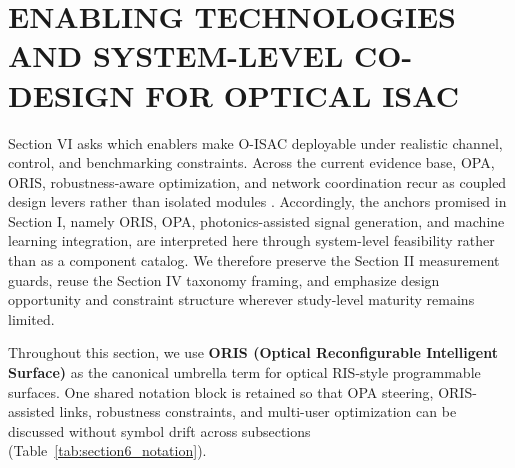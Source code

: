 \documentclass[letterpaper,journal]{IEEEtran}
\begin{document}
\section{ENABLING TECHNOLOGIES AND SYSTEM-LEVEL CO-DESIGN FOR OPTICAL ISAC}

Section VI asks which enablers make O-ISAC deployable under realistic channel, control, and benchmarking constraints. Across the current evidence base, OPA, ORIS, robustness-aware optimization, and network coordination recur as coupled design levers rather than isolated modules \cite{O_ISAC_008,O_ISAC_023,O_ISAC_061,O_ISAC_091,O_ISAC_098,O_ISAC_112,O_ISAC_127}. Accordingly, the anchors promised in Section I, namely ORIS, OPA, photonics-assisted signal generation, and machine learning integration, are interpreted here through system-level feasibility rather than as a component catalog. We therefore preserve the Section II measurement guards, reuse the Section IV taxonomy framing, and emphasize design opportunity and constraint structure wherever study-level maturity remains limited.

Throughout this section, we use \textbf{ORIS (Optical Reconfigurable Intelligent Surface)} as the canonical umbrella term for optical RIS-style programmable surfaces. One shared notation block is retained so that OPA steering, ORIS-assisted links, robustness constraints, and multi-user optimization can be discussed without symbol drift across subsections (Table~\ref{tab:section6_notation}).
\end{document}

